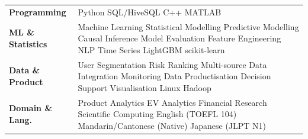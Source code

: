 \documentclass[a4paper,10pt]{article}
\begin{document}
\begin{tabular}{@{}p{3.0cm}p{12.5cm}@{}}
\textbf{Programming} & Python \textperiodcentered{} SQL/HiveSQL \textperiodcentered{} C++ \textperiodcentered{} MATLAB \\[1pt]
\textbf{ML \& Statistics} & Machine Learning \textperiodcentered{} Statistical Modelling \textperiodcentered{} Predictive Modelling \textperiodcentered{} Causal Inference \textperiodcentered{} Model Evaluation \textperiodcentered{} Feature Engineering \textperiodcentered{} NLP \textperiodcentered{} Time Series \textperiodcentered{} LightGBM \textperiodcentered{} scikit-learn \\[1pt]
\textbf{Data \& Product} & User Segmentation \textperiodcentered{} Risk Ranking \textperiodcentered{} Multi-source Data Integration \textperiodcentered{} Monitoring \textperiodcentered{} Data Productisation \textperiodcentered{} Decision Support \textperiodcentered{} Visualisation \textperiodcentered{} Linux \textperiodcentered{} Hadoop \\[1pt]
\textbf{Domain \& Lang.} & Product Analytics \textperiodcentered{} EV Analytics \textperiodcentered{} Financial Research \textperiodcentered{} Scientific Computing \textperiodcentered{} English (TOEFL 104) \textperiodcentered{} Mandarin/Cantonese (Native) \textperiodcentered{} Japanese (JLPT N1) \\
\end{tabular}
\end{document}
